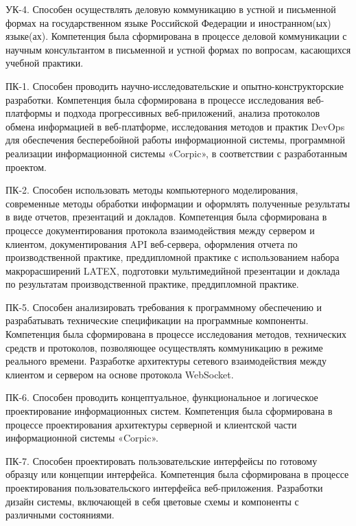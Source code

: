 УК-4. Способен осуществлять деловую коммуникацию в устной и письменной формах на государственном языке Российской Федерации и иностранном(ых) языке(ах). Компетенция была сформирована в процессе деловой коммуникации с научным консультантом в письменной и устной формах по вопросам, касающихся учебной практики.

ПК-1. Способен проводить научно-исследовательские и опытно-конструкторские разработки. Компетенция была сформирована в процессе исследования веб-платформы и подхода прогрессивных веб-приложений, анализа протоколов обмена информацией в веб-платформе, исследования методов и практик DevOps для обеспечения бесперебойной работы информационной системы, программной реализации информационной системы «Corpic», в соответствии с разработанным проектом. 

ПК-2. Способен использовать методы компьютерного моделирования, современные методы обработки информации и оформлять полученные результаты в виде отчетов, презентаций и докладов. Компетенция была сформирована в процессе документирования протокола взаимодействия между сервером и клиентом, документирования API веб-сервера, оформления отчета по производственной практике, преддипломной практике с использованием набора макрорасширений LATEX, подготовки мультимедийной презентации и доклада по результатам производственной практике, преддипломной практике.

ПК-5. Способен анализировать требования к программному обеспечению и разрабатывать технические спецификации на программные компоненты. Компетенция была сформирована в процессе исследования методов, технических средств и протоколов, позволяющее осуществлять коммуникацию в режиме реального времени. Разработке архитектуры сетевого взаимодействия между клиентом и сервером на основе протокола WebSocket.

ПК-6. Способен проводить концептуальное, функциональное и логическое проектирование информационных систем. Компетенция была сформирована в процессе проектирования архитектуры серверной и клиентской части информационной системы «Corpic».

ПК-7. Способен проектировать пользовательские интерфейсы по готовому образцу или концепции интерфейса. Компетенция была сформирована в процессе проектирования пользовательского интерфейса веб-приложения. Разработки дизайн системы, включающей в себя цветовые схемы и компоненты с различными состояниями.


